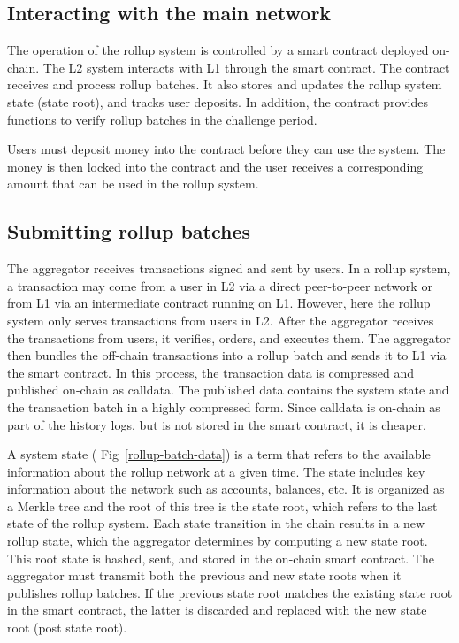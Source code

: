 \documentclass{article}
\begin{document}
\subsection{Interacting with the main network}
The operation of the rollup system is controlled by a smart contract deployed on-chain. The L2 system interacts with L1  through the smart contract. The contract receives and process rollup batches. It also stores and  updates the rollup system state (state root), and tracks user deposits. In addition, the contract provides functions to verify rollup batches in the challenge period.

Users must deposit money into the contract before they can use the system. The money is then locked into the contract and the user receives a corresponding amount that can be used in the rollup system.
\subsection{Submitting rollup batches}
The aggregator receives transactions signed and sent by users. In a rollup system, a transaction may come from a user in L2 via a direct peer-to-peer network or from L1 via an intermediate contract running on L1. However, here the rollup system only serves transactions from users in L2. After the aggregator receives the transactions from users, it verifies, orders, and executes them. The aggregator then bundles the off-chain transactions into a rollup batch and sends it to L1 via the smart contract. In this process, the transaction data is compressed and published on-chain as calldata. The published data contains the system state and the transaction batch in a highly compressed form. Since calldata is on-chain as part of the history logs, but is not stored in the smart contract, it is cheaper.

A system state ( Fig~\ref{rollup-batch-data}) is a term that refers to the available information about the rollup network at a given time. The state includes key information about the network such as accounts, balances, etc. It is organized as a Merkle tree and the root of this tree is the state root, which refers to the last state of the rollup system. Each state transition in the chain results in a new rollup state, which the aggregator determines by computing a new state root. This root state is hashed, sent, and stored in the on-chain smart contract. The aggregator must transmit both the previous and new state roots when it publishes rollup batches. If the previous state root matches the existing state root in the smart contract, the latter is discarded and replaced with the new state root (post state root).
\end{document}
